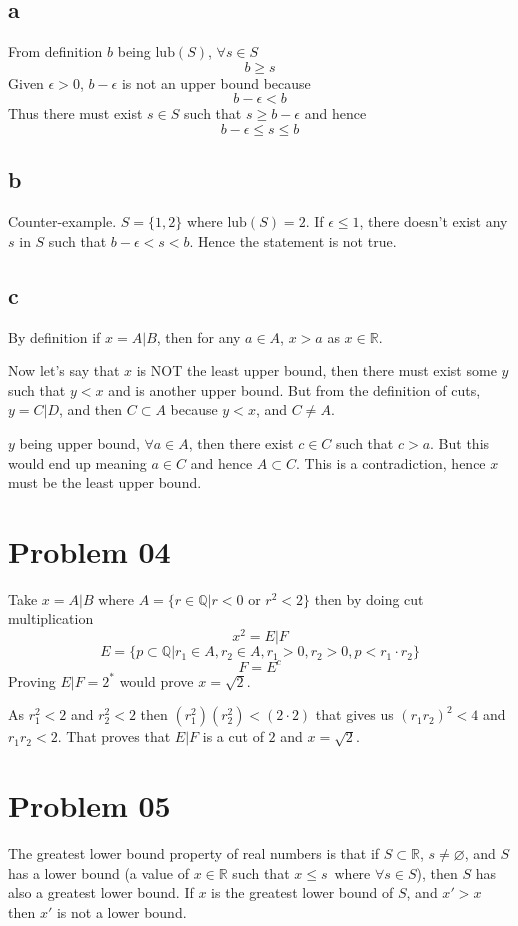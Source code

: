 \documentclass[letter, 12pt]{article}
\begin{document}
\subsection{a} 
	From definition $b$ being $\text{lub}(S)$, $\forall s \in S$
	\[
	b \ge  s 
	\]
	Given $\epsilon > 0$, $b - \epsilon$ is not an upper bound because 
	\[
	b - \epsilon  < b
	\] 
	Thus there must exist $s \in  S$ such that $s \ge  b - \epsilon$ and hence
	\[
	b - \epsilon \le  s \le  b
	\]

\subsection{b} 
	Counter-example. $S = \{1,2\} $ where $\text{lub}(S) = 2$. If $\epsilon \le 1$, there doesn't exist any $s$ in $S$ such that $b - \epsilon < s < b$. Hence the statement is not true.

\subsection{c} 
	By definition if $x = A | B$, then for any $a \in A$, $x > a$ as $x \in \mathbb{R}$.

	Now let's say that $x$ is NOT the least upper bound, then there must exist some $y$ such that $y < x$ and is another upper bound. But from the definition of cuts, $y = C | D$, and then $ C \subset A$ because $y  < x$, and $C \neq A$.    

	$y$ being upper bound, $\forall  a \in A$, then there exist $c \in C$ such that $c > a$. But this would end up meaning $a \in C$ and hence $A \subset C$. This is a contradiction, hence $x$ must be the least upper bound.   
\newpage
\section{Problem 04} 
	Take $x = A | B$ where $A = \{r \in \mathbb{Q} | r < 0 \text{ or } r^2 < 2\} $ then by doing cut multiplication
	\[
	x^2 = E |F 
	\]
	\[
	E = \{p \subset \mathbb{Q} |r_1 \in A, r_2 \in A, r_1 > 0, r_2 > 0,   p < r_1 \cdot  r_2\} 
	\] 
	\[
	F = E^{c}
	\] 
	Proving $E|F = 2^{*}$ would prove $x = \sqrt{2} $. 

	As $r_1^2 < 2$ and $r_2 ^2 < 2$ then $(r_1^2)(r_2^2) < (2\cdot 2)$ that gives us $(r_1 r_2)^2 < 4$ and $r_1 r_2 < 2$. That proves that $E|F$ is a cut of $2$ and $x = \sqrt{2} $.

\newpage	
\section{Problem 05} 
The greatest lower bound property of real numbers is that if $S \subset \mathbb{R}$, $s \neq \varnothing$, and $S$ has a lower bound  (a value of $x \in \mathbb{R}$ such that $x \le s \,\text{ where } \forall s \in S$), then $S$ has also a greatest lower bound. If $x$ is the greatest lower bound of $S$, and $x' > x$ then  $x'$ is not a lower bound. 
\end{document}
